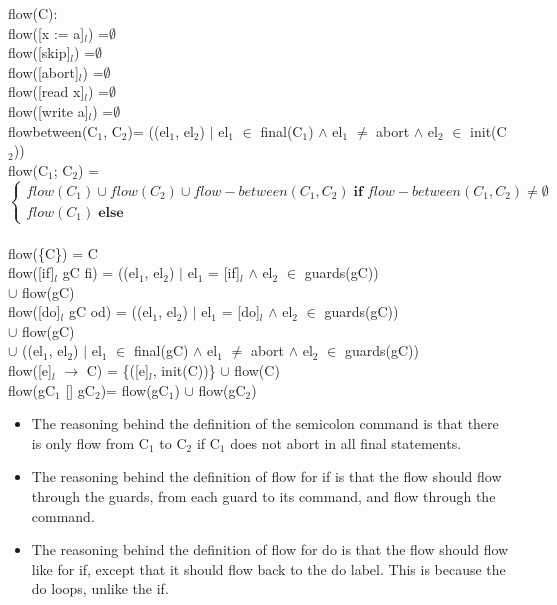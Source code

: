 \docpar
flow(C):\\
flow([x := a]$_l$)        =$\emptyset$\\
flow([skip]$_l$)          =$\emptyset$\\
flow([abort]$_l$)         =$\emptyset$\\
flow([read x]$_l$)        =$\emptyset$\\
flow([write a]$_l$)       =$\emptyset$\\
flow\-between(C$_1$, C$_2$)= ((el$_1$, el$_2$) $\vert$ el$_1$ $\in$ final(C$_1$) $\wedge$ el$_1$ $\neq$ abort $\wedge$ el$_2$ $\in$ init(C$_2$))\\
flow(C$_1$; C$_2$)		 = $$
\begin{cases}
flow(C_1) \cup flow(C_2) \cup flow-between(C_1, C_2) \; \textbf{if} \; flow-between(C_1, C_2) \not = \emptyset\\
flow(C_1) \; \textbf{else}
\end{cases}
$$\\
flow(\{C\}) = C\\
flow([if]$_l$ gC fi) = ((el$_1$, el$_2$) $\vert$ el$_1$ = [if]$_l$ $\wedge$ el$_2$ $\in$ guards(gC))\\
$\cup$ flow(gC)\\
flow([do]$_l$ gC od) = ((el$_1$, el$_2$) $\vert$ el$_1$ = [do]$_l$ $\wedge$ el$_2$ $\in$ guards(gC))\\
$\cup$ flow(gC)\\
$\cup$ ((el$_1$, el$_2$) $\vert$ el$_1$ $\in$ final(gC) $\wedge$ el$_1$ $\neq$ abort $\wedge$ el$_2$ $\in$ guards(gC))\\
flow([e]$_l$ $\to$ C)      = \{([e]$_l$, init(C))\} $\cup$ flow(C) \\
flow(gC$_1$ [] gC$_2$)= flow(gC$_1$) $\cup$ flow(gC$_2$)\\


\begin{itemize}
\item The reasoning behind the definition of the semicolon command is that there
is only flow from C$_1$ to C$_2$ if C$_1$ does not abort in all final statements.
\item The reasoning behind the definition of flow for if is that the flow should
flow through the guards, from each guard to its command, and flow through the command.
\item The reasoning behind the definition of flow for do is that the flow should flow
like for if, except that it should flow back to the do label. This is because the do loops,
unlike the if.
\end{itemize}

